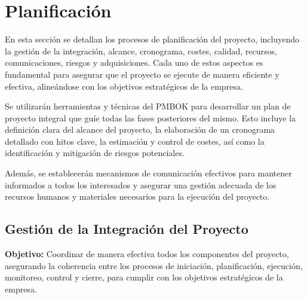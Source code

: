 \section{Planificación}

  En esta sección se detallan los procesos de planificación del proyecto, incluyendo la gestión de la integración, alcance, cronograma, costes, calidad, recursos, comunicaciones, riesgos y adquisiciones. Cada uno de estos aspectos es fundamental para asegurar que el proyecto se ejecute de manera eficiente y efectiva, alineándose con los objetivos estratégicos de la empresa.

    Se utilizarán herramientas y técnicas del PMBOK para desarrollar un plan de proyecto integral que guíe todas las fases posteriores del mismo. Esto incluye la definición clara del alcance del proyecto, la elaboración de un cronograma detallado con hitos clave, la estimación y control de costes, así como la identificación y mitigación de riesgos potenciales.

    Además, se establecerán mecanismos de comunicación efectivos para mantener informados a todos los interesados y asegurar una gestión adecuada de los recursos humanos y materiales necesarios para la ejecución del proyecto.

    \subsection{Gestión de la Integración del Proyecto}
    
    \textbf{Objetivo:}
      Coordinar de manera efectiva todos los componentes del proyecto, asegurando la coherencia entre los procesos de iniciación, planificación, ejecución, monitoreo, control y cierre, para cumplir con los objetivos estratégicos de la empresa.

